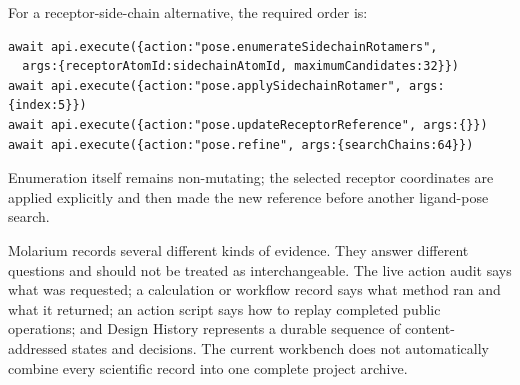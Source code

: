For a receptor-side-chain alternative, the required order is:

\begin{lstlisting}
await api.execute({action:"pose.enumerateSidechainRotamers",
  args:{receptorAtomId:sidechainAtomId, maximumCandidates:32}})
await api.execute({action:"pose.applySidechainRotamer", args:{index:5}})
await api.execute({action:"pose.updateReceptorReference", args:{}})
await api.execute({action:"pose.refine", args:{searchChains:64}})
\end{lstlisting}

Enumeration itself remains non-mutating; the selected receptor coordinates are applied explicitly and then made the new reference before another ligand-pose search.


Molarium records several different kinds of evidence. They answer different questions and should not be treated as interchangeable. The live action audit says what was requested; a calculation or workflow record says what method ran and what it returned; an action script says how to replay completed public operations; and Design History represents a durable sequence of content-addressed states and decisions. The current workbench does not automatically combine every scientific record into one complete project archive.

